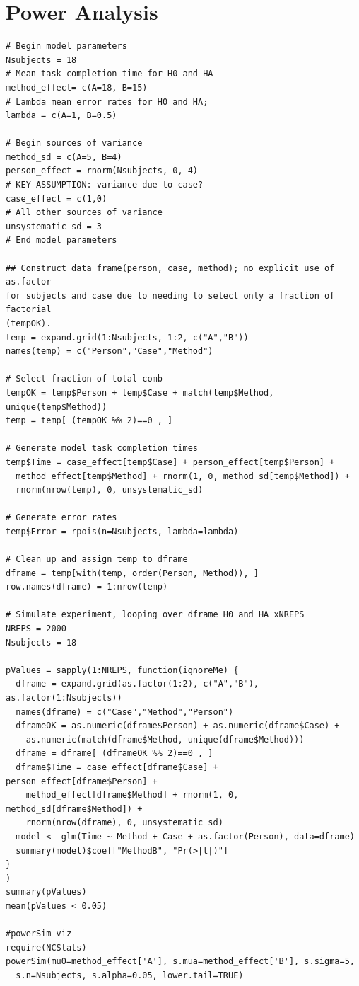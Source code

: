 \documentclass[11pt]{article}
\begin{document}
\section{Power Analysis}
\label{poweranalysis}
\begin{verbatim}
# Begin model parameters
Nsubjects = 18
# Mean task completion time for H0 and HA
method_effect= c(A=18, B=15)
# Lambda mean error rates for H0 and HA;
lambda = c(A=1, B=0.5)

# Begin sources of variance
method_sd = c(A=5, B=4)
person_effect = rnorm(Nsubjects, 0, 4)
# KEY ASSUMPTION: variance due to case?
case_effect = c(1,0)
# All other sources of variance
unsystematic_sd = 3
# End model parameters

## Construct data frame(person, case, method); no explicit use of as.factor 
for subjects and case due to needing to select only a fraction of factorial
(tempOK).
temp = expand.grid(1:Nsubjects, 1:2, c("A","B"))
names(temp) = c("Person","Case","Method")

# Select fraction of total comb
tempOK = temp$Person + temp$Case + match(temp$Method, unique(temp$Method))
temp = temp[ (tempOK %% 2)==0 , ]

# Generate model task completion times
temp$Time = case_effect[temp$Case] + person_effect[temp$Person] + 
  method_effect[temp$Method] + rnorm(1, 0, method_sd[temp$Method]) +
  rnorm(nrow(temp), 0, unsystematic_sd)

# Generate error rates
temp$Error = rpois(n=Nsubjects, lambda=lambda)

# Clean up and assign temp to dframe
dframe = temp[with(temp, order(Person, Method)), ]
row.names(dframe) = 1:nrow(temp)

# Simulate experiment, looping over dframe H0 and HA xNREPS
NREPS = 2000
Nsubjects = 18

pValues = sapply(1:NREPS, function(ignoreMe) {
  dframe = expand.grid(as.factor(1:2), c("A","B"), as.factor(1:Nsubjects))
  names(dframe) = c("Case","Method","Person")
  dframeOK = as.numeric(dframe$Person) + as.numeric(dframe$Case) + 
    as.numeric(match(dframe$Method, unique(dframe$Method)))
  dframe = dframe[ (dframeOK %% 2)==0 , ]
  dframe$Time = case_effect[dframe$Case] + person_effect[dframe$Person] + 
    method_effect[dframe$Method] + rnorm(1, 0, method_sd[dframe$Method]) + 
    rnorm(nrow(dframe), 0, unsystematic_sd)
  model <- glm(Time ~ Method + Case + as.factor(Person), data=dframe)
  summary(model)$coef["MethodB", "Pr(>|t|)"]
}
)
summary(pValues)
mean(pValues < 0.05)

#powerSim viz
require(NCStats)
powerSim(mu0=method_effect['A'], s.mua=method_effect['B'], s.sigma=5, 
  s.n=Nsubjects, s.alpha=0.05, lower.tail=TRUE)
\end{verbatim}
\end{document}
